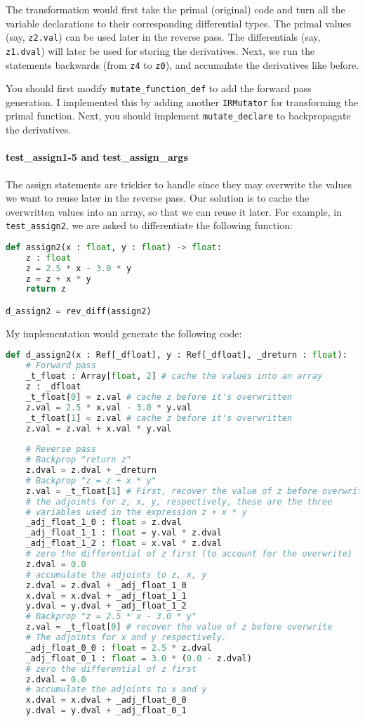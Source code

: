 The transformation would first take the primal (original) code and turn all the variable declarations to their corresponding differential types. The primal values (say, \lstinline{z2.val}) can be used later in the reverse pass. The differentials (say, \lstinline{z1.dval}) will later be used for storing the derivatives. Next, we run the statements backwards (from \lstinline{z4} to \lstinline{z0}), and accumulate the derivatives like before.

You should first modify \lstinline{mutate_function_def} to add the forward pass generation. I implemented this by adding another \lstinline{IRMutator} for transforming the primal function. Next, you should implement \lstinline{mutate_declare} to backpropagate the derivatives.

\paragraph{test_assign1-5 and test_assign_args} The assign statements are trickier to handle since they may overwrite the values we want to reuse later in the reverse pass. Our solution is to cache the overwritten values into an array, so that we can reuse it later. For example, in \lstinline{test_assign2}, we are asked to differentiate the following function:
\begin{lstlisting}[language=Python]
def assign2(x : float, y : float) -> float:
    z : float
    z = 2.5 * x - 3.0 * y
    z = z + x * y
    return z

d_assign2 = rev_diff(assign2)
\end{lstlisting}

My implementation would generate the following code:
\begin{lstlisting}[language=Python]
def d_assign2(x : Ref[_dfloat], y : Ref[_dfloat], _dreturn : float):
	# Forward pass
	_t_float : Array[float, 2] # cache the values into an array
	z : _dfloat
	_t_float[0] = z.val # cache z before it's overwritten
	z.val = 2.5 * x.val - 3.0 * y.val
	_t_float[1] = z.val # cache z before it's overwritten
	z.val = z.val + x.val * y.val
	
	# Reverse pass
	# Backprop "return z"
	z.dval = z.dval + _dreturn
	# Backprop "z = z + x * y"
	z.val = _t_float[1] # First, recover the value of z before overwrite
	# the adjoints for z, x, y, respectively, these are the three
	# variables used in the expression z + x * y
	_adj_float_1_0 : float = z.dval
	_adj_float_1_1 : float = y.val * z.dval
	_adj_float_1_2 : float = x.val * z.dval
	# zero the differential of z first (to account for the overwrite)
	z.dval = 0.0
	# accumulate the adjoints to z, x, y
	z.dval = z.dval + _adj_float_1_0
	x.dval = x.dval + _adj_float_1_1
	y.dval = y.dval + _adj_float_1_2
	# Backprop "z = 2.5 * x - 3.0 * y"
	z.val = _t_float[0] # recover the value of z before overwrite
	# The adjoints for x and y respectively.
	_adj_float_0_0 : float = 2.5 * z.dval
	_adj_float_0_1 : float = 3.0 * (0.0 - z.dval)
	# zero the differential of z first
	z.dval = 0.0
	# accumulate the adjoints to x and y
	x.dval = x.dval + _adj_float_0_0
	y.dval = y.dval + _adj_float_0_1
\end{lstlisting}

